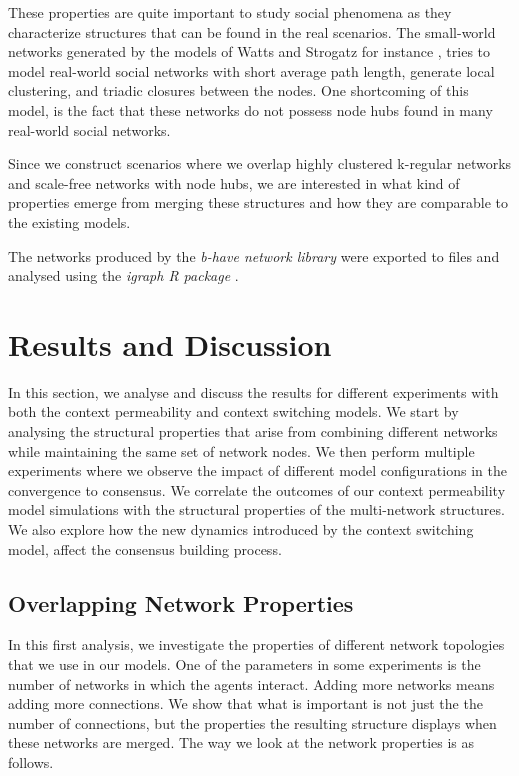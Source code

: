 \documentclass[preprint,number]{elsarticle}
\begin{document}
These properties are quite important to study social phenomena as they characterize structures that 
can be found in the real scenarios. The small-world networks generated by the models of Watts and Strogatz for instance \cite{Watts1998}, tries to model real-world social networks with short average path length, generate local clustering, and triadic closures between the nodes. One shortcoming of this model, is the fact that these networks do not possess node hubs found in many real-world social networks.

Since we construct scenarios where we overlap highly clustered k-regular networks and scale-free networks with node hubs, we are interested in what kind of properties emerge from merging these structures and how they are comparable to the existing models. 

The networks produced by the \textit{b-have network library} \cite{Nunes:Software:11069} were exported to files and analysed using the \textit{igraph R package} \cite{igraph2006}. 

\section{Results and Discussion}
\label{sec:results-discussion}

\noindent In this section, we analyse and discuss the results for different experiments with both the
context permeability and context switching models. We start by analysing the structural properties
that arise from combining different networks while maintaining the same set of network nodes. We then perform multiple experiments where we observe the impact of different model configurations in the convergence to consensus. We correlate the outcomes of our context permeability model simulations with the structural properties of the multi-network structures. We also explore how the new dynamics introduced by the context switching model, affect the consensus building process. 

\subsection{Overlapping Network Properties}
\label{sec:network_properties}
\noindent In this first analysis, we investigate the properties of different network topologies that we use in our models. 
One of the parameters in some experiments is the number of networks in which the agents interact. Adding more networks means adding more connections. 
We show that what is important is not just the the number of connections, but the properties the resulting structure displays when these networks are merged. The way we look at the network properties is as follows.
\end{document}
